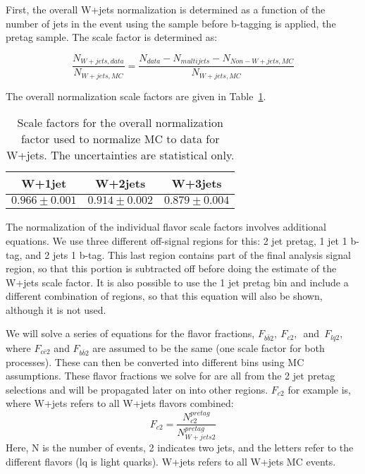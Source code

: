 First, the overall W+jets normalization is determined as a function of the number of jets in the event using the sample before b-tagging is applied, the pretag sample.  The scale factor is determined as:

\begin{equation} \frac{N_{W+jets, data}}{N_{W+jets, MC}} = \frac{N_{data} - N_{multijets} - N_{Non-W+jets, MC}}{N_{W+jets, MC}} \end{equation}

The overall normalization scale factors are given in Table~\ref{wjetoverallnorm}.

\begin{table}[htdp]
\begin{center}
\begin{tabular}{ccc}
\hline
W+1jet & W+2jets & W+3jets \\
\hline
$0.966\pm0.001$ & $0.914\pm0.002$ & $0.879\pm0.004$ \\
\hline
\end{tabular}
\caption{Scale factors for the overall normalization factor used to normalize MC to data for W+jets.  The uncertainties are statistical only.}
\label{wjetoverallnorm}
\end{center}
\end{table}

The normalization of the individual flavor scale factors involves additional equations.  We use three different off-signal regions for this: 2 jet pretag, 1 jet 1 b-tag, and 2 jets 1 b-tag.  This last region contains part of the final analysis signal region, so that this portion is subtracted off before doing the estimate of the W+jets scale factor.  It is also possible to use the 1 jet pretag bin and include a different combination of regions, so that this equation will also be shown, although it is not used.

We will solve a series of equations for the flavor fractions, $F_{b\bar{b}2},~F_{c2},$~and~$F_{lq2}$, where $F_{c\bar{c}2}$ and $F_{b\bar{b}2}$ are assumed to be the same (one scale factor for both processes).  These can then be converted into different bins using MC assumptions.  These flavor fractions we solve for are all from the 2 jet pretag selections and will be propagated later on into other regions.  $F_{c2}$ for example is, where W+jets refers to all W+jets flavors combined:
\begin{equation} F_{c2} = \frac{N_{c2}^{pretag}}{N_{W+jets 2}^{pretag}} \end{equation}
Here, N is the number of events, 2 indicates two jets, and the letters refer to the different flavors (lq is light quarks).  W+jets refers to all W+jets MC events.

